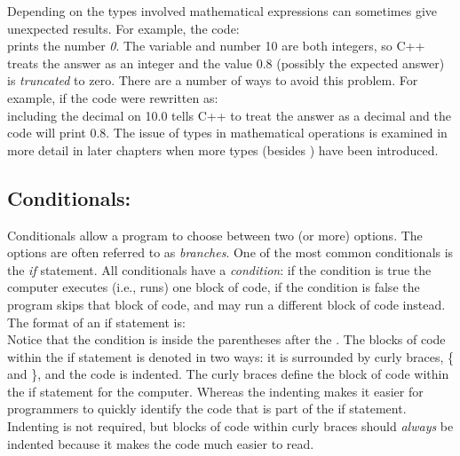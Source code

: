 Depending on the types involved mathematical expressions can sometimes give unexpected results.  For example, the code:\\
prints the number \emph{0}.  The variable  and number 10 are both integers, so C++ treats the answer as an integer and the value 0.8 (possibly the expected answer) is \emph{truncated} to zero.  There are a number of ways to avoid this problem.  For example, if the code were rewritten as:\\
including the decimal on 10.0 tells C++ to treat the answer as a decimal and the code will print 0.8.  The issue of types in mathematical operations is examined in more detail in later chapters when more types (besides ) have been introduced.

\subsection{Conditionals: }

Conditionals allow a program to choose between two (or more) options.  The options are often referred to as \emph{branches}.  One of the most common conditionals is the \emph{if} statement.  All conditionals have a \emph{condition}: if the condition is true the computer executes (i.e., runs) one block of code, if the condition is false the program skips that block of code, and may run a different block of code instead.  The format of an if statement is:\\
Notice that the condition is inside the parentheses after the .  The blocks of code within the if statement is denoted in two ways: it is surrounded by curly braces, \{ and \}, and the code is indented.  The curly braces define the block of code within the if statement for the computer.  Whereas the indenting makes it easier for programmers to quickly identify the code that is part of the if statement.  Indenting is not required, but blocks of code within curly braces should \emph{always} be indented because it makes the code much easier to read.  


